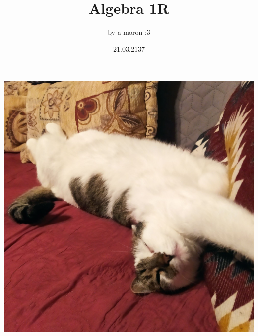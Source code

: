 \documentclass{article}[13pt]
\title {Algebra 1R}
\author{by a moron :3}
\date {21.03.2137}
\begin{document}

\maketitle

\newpage

\begin{center}
    \includegraphics[width=\textwidth]{./kytel.jpg}
\end{center}

\newpage



\newpage


\end{document}
